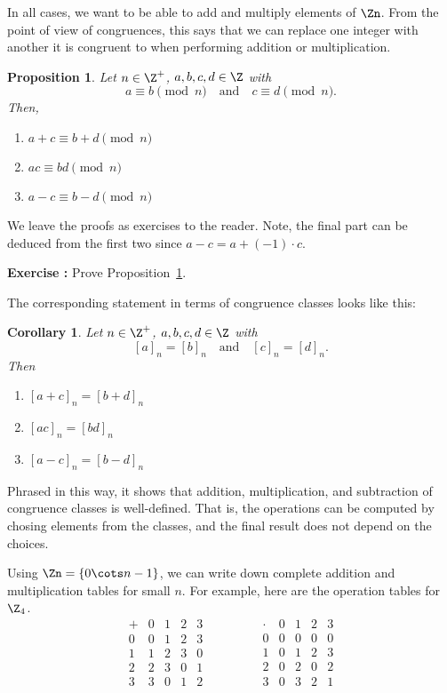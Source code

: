\documentclass[12pt]{amsart}
\newcounter{probs}
\newenvironment{prob}{%
  \refstepcounter{probs}
  \par\medskip\noindent\textbf{Exercise \theprobs:} }{\par\medskip}
\theoremstyle{plain}
\newtheorem{prop}[thm]{Proposition}
\newtheorem{cor}[thm]{Corollary}
\theoremstyle{definition}
\theoremstyle{remark}
\begin{document}
In all cases, we want to be able to add and multiply elements of
$\Zn$.  From the point of view of congruences, this says that we can
replace one integer with another it is congruent to when performing
addition or multiplication.
\begin{prop}\label{cong-well-def}
  Let $n\in\Z^+$, $a,b,c,d\in \Z$ with 
  \[ a\equiv b \pmod n \quad\text{and}\quad c\equiv d\pmod n.\]
  Then,
  \begin{enumerate}
  \item $a+c\equiv b+d\pmod n$
  \item $ac\equiv bd \pmod n$
  \item $a-c\equiv b-d\pmod n$
  \end{enumerate}
\end{prop}
We leave the proofs as exercises to the reader.  Note, the final part
can be deduced from the first two since $a-c=a+(-1)\cdot c$.
\begin{prob}
  Prove Proposition~\ref{cong-well-def}.
\end{prob}


The corresponding statement in terms of congruence classes looks like
this:
\begin{cor}
  Let $n\in\Z^+$, $a,b,c,d\in \Z$ with 
  \[ [a]_n=[b]_n  \quad\text{and}\quad [c]_n= [d]_n.\]
  Then
  \begin{enumerate}
  \item $[a+c]_n=[b+d]_n$
  \item $[ac]_n= [bd]_n$
  \item $[a-c]_n=[b-d]_n$
  \end{enumerate}
\end{cor}
Phrased in this way, it shows that addition, multiplication, and
subtraction of congruence classes is well-defined.  That is, the
operations can be computed by chosing elements from the classes, and
the final result does not depend on the choices.


Using $\Zn=\{0\cots n-1\}$, we can write down complete addition and
multiplication tables for small $n$.  For example, here are the
operation tables for $\Z_4$.
\[
\begin{array}{c|*{4}{|c}}
+ & 0 & 1 & 2 & 3 \\ \hline \hline
0 & 0 & 1 & 2 & 3 \\ \hline
1 & 1 & 2 & 3 & 0 \\ \hline
2 & 2 & 3 & 0 & 1 \\ \hline
3 & 3 & 0 & 1 & 2 
\end{array}
\qquad
\qquad
\begin{array}{c|*{4}{|c}}
\cdot & 0 & 1 & 2 & 3 \\ \hline \hline
0 & 0 & 0 & 0 & 0 \\ \hline
1 & 0 & 1 & 2 & 3 \\ \hline
2 & 0 & 2 & 0 & 2 \\ \hline
3 & 0 & 3 & 2 & 1 
\end{array}
\]
\end{document}
